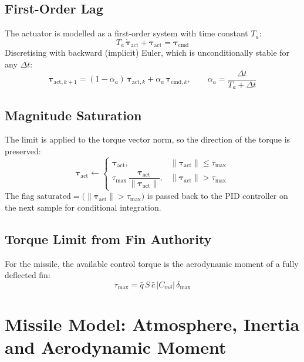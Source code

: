\documentclass[11pt, a4paper]{article}
\newcommand{\vect}[1]{\boldsymbol{#1}}
\begin{document}
\subsection{First-Order Lag}
The actuator is modelled as a first-order system with time constant $T_a$:
\begin{equation}
T_a\, \dot{\vect{\tau}}_{\text{act}} + \vect{\tau}_{\text{act}} = \vect{\tau}_{\text{cmd}}
\end{equation}
Discretising with backward (implicit) Euler, which is unconditionally stable for any $\Delta t$:
\begin{equation}
\vect{\tau}_{\text{act}, k+1} = (1 - \alpha_a)\, \vect{\tau}_{\text{act}, k} + \alpha_a\, \vect{\tau}_{\text{cmd}, k},
\qquad
\alpha_a = \frac{\Delta t}{T_a + \Delta t}
\end{equation}

\subsection{Magnitude Saturation}
The limit is applied to the torque vector norm, so the direction of the torque is preserved:
\begin{equation}
\vect{\tau}_{\text{act}} \leftarrow
\begin{cases}
\vect{\tau}_{\text{act}}, & \lVert \vect{\tau}_{\text{act}} \rVert \le \tau_{\max} \\[1ex]
\tau_{\max}\, \dfrac{\vect{\tau}_{\text{act}}}{\lVert \vect{\tau}_{\text{act}} \rVert}, & \lVert \vect{\tau}_{\text{act}} \rVert > \tau_{\max}
\end{cases}
\end{equation}
The flag $\text{saturated} = \big( \lVert \vect{\tau}_{\text{act}} \rVert > \tau_{\max} \big)$ is passed back to the PID controller on the next sample for conditional integration.

\subsection{Torque Limit from Fin Authority}
For the missile, the available control torque is the aerodynamic moment of a fully deflected fin:
\begin{equation}
\tau_{\max} = \bar{q}\, S\, \bar{c}\, \lvert C_{m\delta} \rvert\, \delta_{\max}
\end{equation}

\section{Missile Model: Atmosphere, Inertia and Aerodynamic Moment}
\end{document}
